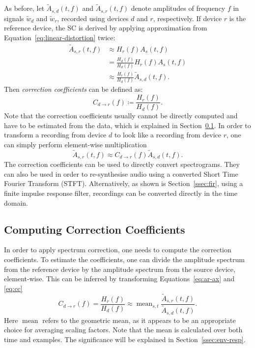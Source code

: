 \documentclass[a4paper]{article}
\newcommand{\va}{A}
\newcommand{\vh}{H}
\newcommand{\vc}{C}
\newcommand{\vw}{w}
\newcommand{\vs}{s}
\newcommand{\ff}{f}
\newcommand{\wave}[1]{\widetilde{\vw}_{#1}}
\newcommand{\dr}{r}
\newcommand{\dd}{d}
\newcommand{\ampltf}[1]{\widetilde{\va}_{#1}\left(t,\ff\right)}
\newcommand{\respf}[1]{\vh_{#1}\left(\ff\right)}
\newcommand{\magntf}[2][]{\va_{#2}^{#1}\left(t,\ff\right)}
\newcommand{\coeff}[1]{\vc_{#1}\left(\ff\right)}
\DeclareMathOperator*{\mean}{mean}
\begin{document}
As before, let $\ampltf{\vs,\dd}$ and $\ampltf{\vs,\dr}$ denote amplitudes of frequency $f$ in signals $\wave{\dd}$ and $\wave{\dr}$, recorded using devices $\dd$ and $\dr$, respectively. If device $\dr$ is the reference device, the SC is derived by applying approximation from Equation~\eqref{eq:linear-distortion} twice:
\begin{align}
    \ampltf{\vs,\dr} 
        &\approx \respf{\dr}\magntf{\vs} \\
        &= \frac{\respf{\dd}}{\respf{\dd}}\respf{\dr}\magntf{\vs} \\
        &\approx \frac{\respf{\dr}}{\respf{\dd}}\ampltf{\vs,\dd}
        .
\label{eq:ar-ax}
\end{align}
Then \textit{correction coefficients} can be defined as:
\begin{equation}
    \coeff{\dd\rightarrow\dr} \coloneqq \frac{\respf{\dr}}{\respf{\dd}}.
    \label{eq:cc}
\end{equation}
Note that the correction coefficients usually cannot be directly computed and have to be estimated from the data, which is explained in Section~\ref{ssec:computing-cc}.
In order to transform a recording from device $\dd$ to look like a recording from device $\dr$, one can simply perform element-wise multiplication
\begin{equation}
    \ampltf{\vs,\dr} \approx \coeff{\dd\rightarrow\dr}\ampltf{\vs,\dd}.
\end{equation}
The correction coefficients can be used to directly convert spectrograms. They can also be used in order to re-synthesise audio using a converted Short Time Fourier Transform (STFT). Alternatively, as shown is Section~\ref{ssec:fir}, using a finite impulse response filter, recordings can be converted directly in the time domain.


\subsection{Computing Correction Coefficients}
\label{ssec:computing-cc}



In order to apply spectrum correction, one needs to compute the correction coefficients. To estimate the coefficients, one can divide
the amplitude spectrum from the reference device by the amplitude spectrum from the source device, element-wise. 
This can be inferred by transforming Equations~\eqref{eq:ar-ax} and \eqref{eq:cc}
\begin{equation}
    \coeff{\dd\rightarrow\dr} 
    = \frac{\respf{\dr}}{\respf{\dd}} 
    \approx \mean_{\vs, t} \frac{\ampltf{\vs,\dr}}{\ampltf{\vs,\dd}}.
\end{equation}
Here $\mean$ refers to the geometric mean, as it appears to be an appropriate choice for averaging scaling factors.
Note that the mean is calculated over both time and examples. 
The significance will be explained in Section~\ref{ssec:env-resp}.
\end{document}
